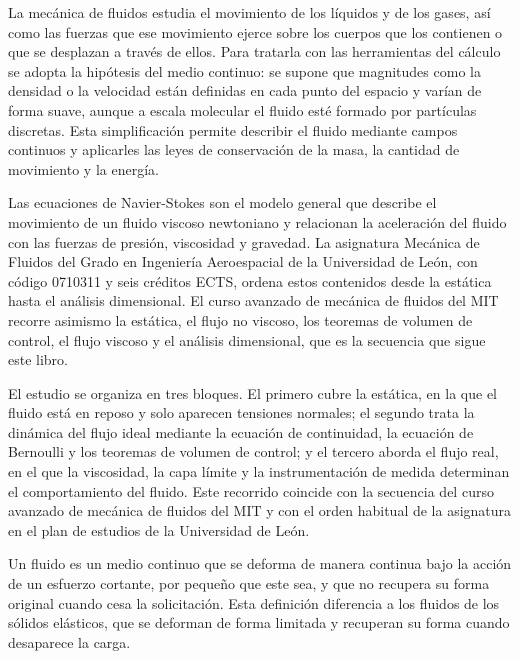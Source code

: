 \documentclass{book}
\begin{document}
La mecánica de fluidos estudia el movimiento de los líquidos y de los gases, así como las fuerzas que ese movimiento ejerce sobre los cuerpos que los contienen o que se desplazan a través de ellos. Para tratarla con las herramientas del cálculo se adopta la hipótesis del medio continuo: se supone que magnitudes como la densidad o la velocidad están definidas en cada punto del espacio y varían de forma suave, aunque a escala molecular el fluido esté formado por partículas discretas. Esta simplificación permite describir el fluido mediante campos continuos y aplicarles las leyes de conservación de la masa, la cantidad de movimiento y la energía.

Las ecuaciones de Navier-Stokes son el modelo general que describe el movimiento de un fluido viscoso newtoniano y relacionan la aceleración del fluido con las fuerzas de presión, viscosidad y gravedad. La asignatura Mecánica de Fluidos del Grado en Ingeniería Aeroespacial de la Universidad de León, con código 0710311 y seis créditos ECTS, ordena estos contenidos desde la estática hasta el análisis dimensional. El curso avanzado de mecánica de fluidos del MIT recorre asimismo la estática, el flujo no viscoso, los teoremas de volumen de control, el flujo viscoso y el análisis dimensional, que es la secuencia que sigue este libro.

El estudio se organiza en tres bloques. El primero cubre la estática, en la que el fluido está en reposo y solo aparecen tensiones normales; el segundo trata la dinámica del flujo ideal mediante la ecuación de continuidad, la ecuación de Bernoulli y los teoremas de volumen de control; y el tercero aborda el flujo real, en el que la viscosidad, la capa límite y la instrumentación de medida determinan el comportamiento del fluido. Este recorrido coincide con la secuencia del curso avanzado de mecánica de fluidos del MIT y con el orden habitual de la asignatura en el plan de estudios de la Universidad de León.

\begin{tcolorbox}[title={Definición}, studiumdef, breakable]

Un fluido es un medio continuo que se deforma de manera continua bajo la acción de un esfuerzo cortante, por pequeño que este sea, y que no recupera su forma original cuando cesa la solicitación. Esta definición diferencia a los fluidos de los sólidos elásticos, que se deforman de forma limitada y recuperan su forma cuando desaparece la carga.
\end{tcolorbox}
\end{document}
